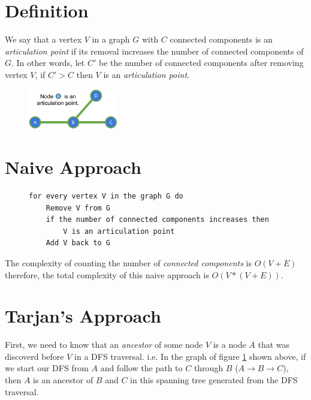 \documentclass[twoside, openany]{book}
\begin{document}
\section*{Definition}
We say that a vertex $V$ in a graph $G$ with $C$
connected components is an \textit{articulation point} if its removal increases the number of connected components of $G$.
In other words, let $C'$ be the number of connected components after removing vertex $V$, if $C' > C$ then $V$ is an \textit{articulation point}.

\begin{figure}[H]
  \centering
  \includegraphics[width=0.35\textwidth]{"Images/Graph Theory/Articulation Points And Bridges/g1.pdf"}
  \caption{}
  \label{fig:apb_g1}
\end{figure}

\section*{Naive Approach}

\begin{figure}[thp]
  \centering
  \begin{minipage}[c]{0.9\textwidth}
    \begin{verbatim}
for every vertex V in the graph G do
    Remove V from G
    if the number of connected components increases then
        V is an articulation point
    Add V back to G
      \end{verbatim}
  \end{minipage}
\end{figure}

The complexity of counting the number of \textit{connected components} is $O(V + E)$ therefore,
the total complexity of this naive approach is $O(V * (V + E))$.

\section*{Tarjan's Approach}

First, we need to know that an \textit{ancestor} of some node $V$ is a node $A$ that was discoverd
before $V$ in a DFS traversal. i.e. In the graph of figure \ref{fig:apb_g1} shown above, if we start
our DFS from $A$ and follow the path to $C$ through $B$ ($A \rightarrow B \rightarrow C$), then $A$
is an ancestor of $B$ and $C$ in this spanning tree generated from the DFS traversal.\\
\end{document}
